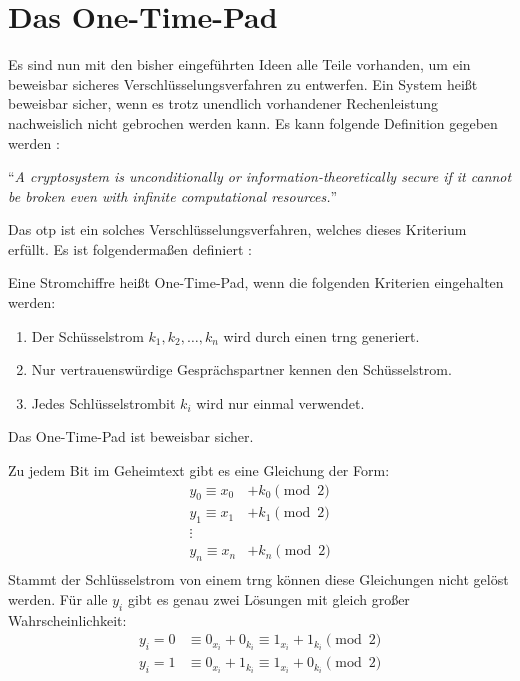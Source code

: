 \section{Das One-Time-Pad}
Es sind nun mit den bisher eingeführten Ideen alle Teile vorhanden, um ein beweisbar
sicheres Verschlüsselungsverfahren zu entwerfen. Ein System heißt beweisbar sicher,
wenn es trotz unendlich vorhandener Rechenleistung nachweislich nicht gebrochen werden kann.
Es kann folgende Definition gegeben werden \parencite[36]{BOOK:crypto}:

\begin{definition}
  \enquote{\textit{A cryptosystem is unconditionally or in\-formation-theoretically
      secure if it cannot be broken even with infinite computational resources.}}
\end{definition}

\noindent
Das \ac{otp} ist ein solches Verschlüsselungsverfahren, welches dieses Kriterium
erfüllt. Es ist folgendermaßen definiert \parencite[37]{BOOK:crypto}:

\begin{definition}
  Eine Stromchiffre heißt One-Time-Pad, wenn die folgenden Kriterien eingehalten werden:
  \begin{enumerate}
    \item Der Schüsselstrom $k_1,k_2,\dots,k_n$ wird durch einen \ac{trng} generiert.
    \item Nur vertrauenswürdige Gesprächspartner kennen den Schüsselstrom.
    \item Jedes Schlüsselstrombit $k_i$ wird nur einmal verwendet.
  \end{enumerate}
  Das One-Time-Pad ist beweisbar sicher.
\end{definition}
\noindent
Zu jedem Bit im Geheimtext gibt es eine Gleichung der Form:
\begin{align*}
  y_0   \equiv x_0 & + k_0 \pmod{2} \\
  y_1   \equiv x_1 & + k_1 \pmod{2} \\
  \vdots           &                \\
  y_n   \equiv x_n & + k_n \pmod{2} \\
\end{align*}
\noindent
Stammt der Schlüsselstrom von einem \ac{trng} können diese Gleichungen nicht gelöst werden.
Für alle $y_i$ gibt es genau zwei Lösungen mit gleich großer Wahrscheinlichkeit:
\begin{align*}
  y_i = 0 & \equiv 0_{x_i} + 0_{k_i} \equiv 1_{x_i} + 1_{k_i} \pmod{2} \\
  y_i = 1 & \equiv 0_{x_i} + 1_{k_i} \equiv 1_{x_i} + 0_{k_i} \pmod{2}
\end{align*}

